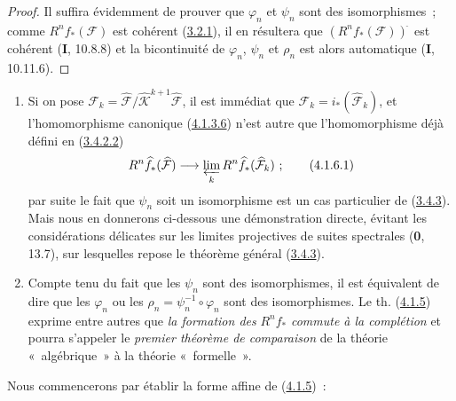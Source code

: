 \begin{proof}
Il suffira évidemment de prouver que $\varphi_n$ et $\psi_n$ sont des
isomorphismes~; comme $R^nf_*(\mathcal F)$ est cohérent
(\hyperref[III.3.2.1-fr]{3.2.1}), il en résultera que
$(R^nf_*(\mathcal F))^{\widehat{\,}}$ est cohérent (\textbf{I}, 10.8.8) et la bicontinuité
de $\varphi_n$, $\psi_n$ et $\rho_n$ est alors automatique (\textbf{I}, 10.11.6).
\end{proof}

\begin{remarks}[4.1.6]
\label{III.4.1.6-fr}
\upshape
\begin{enumerate}
\item[(i)] Si on pose
$\mathcal F_k=
\widehat{\mathcal F}/\widehat{\mathcal K}^{k+1}
\widehat{\mathcal F}$, il est immédiat que
$\mathcal F_k=i_*(\widehat{\mathcal F}_k)$, et l'homomorphisme canonique
(\hyperref[III.4.1.3.6-fr]{4.1.3.6}) n'est autre que l'homomorphisme déjà
défini en (\hyperref[III.3.4.2.2-fr]{3.4.2.2})
\[
R^n\widehat f_*(\widehat{\mathcal F})
\longrightarrow\varprojlim_kR^n\widehat f_*(\widehat{\mathcal F}_k)~;
\tag{4.1.6.1}\label{III.4.1.6.1-fr}
\]
par suite le fait que $\psi_n$ soit un isomorphisme est un cas particulier
de (\hyperref[III.3.4.3-fr]{3.4.3}). Mais nous en donnerons ci-dessous une
démonstration directe, évitant les considérations délicates sur les limites
projectives de suites spectrales (\textbf{0}, 13.7), sur lesquelles repose le
théorème général (\hyperref[III.3.4.3-fr]{3.4.3}).

\item[(ii)] Compte tenu du fait que les $\psi_n$ sont des isomorphismes, il
est équivalent de dire que les $\varphi_n$ ou les
$\rho_n=\psi_n^{-1}\circ\varphi_n$ sont des isomorphismes. Le th.
(\hyperref[III.4.1.5-fr]{4.1.5}) exprime entre autres que \emph{la formation des}
$R^nf_*$ \emph{commute à la complétion} et pourra s'appeler le \emph{premier théorème de
comparaison} de la théorie «~algébrique~» à la théorie «~formelle~».
\end{enumerate}

Nous commencerons par établir la forme affine de
(\hyperref[III.4.1.5-fr]{4.1.5})~:
\end{remarks}

